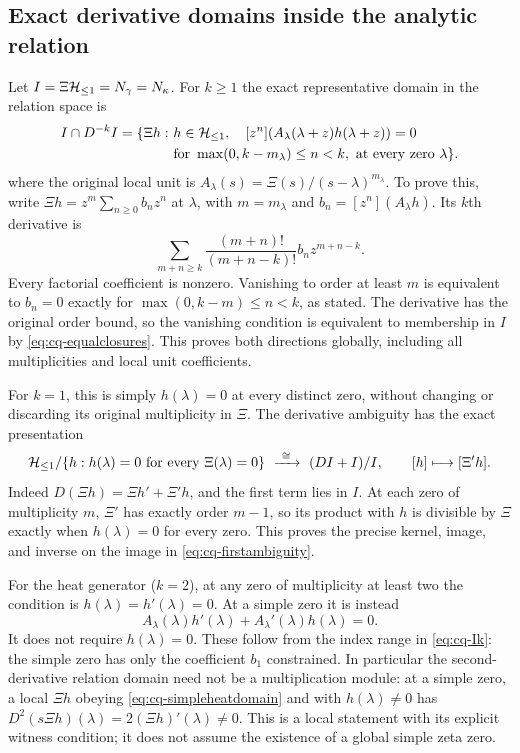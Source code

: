\subsection{Exact derivative domains inside the analytic relation}
Let $I=\Xi\mathcal H_{\leq 1}=N_\gamma=N_\kappa$. For $k\geq1$ the exact
representative domain in the relation space is
\begin{equation}\label{eq:cq-Ik}
 \begin{aligned}
 I\cap D^{-k}I=\{\Xi h:\ &h\in\mathcal H_{\leq 1},\quad
 [z^n](A_\lambda(\lambda+z)h(\lambda+z))=0\\
 &\text{for }\max(0,k-m_\lambda)\leq n<k,
                   \text{ at every zero }\lambda\}.
 \end{aligned}
\end{equation}
where the original local unit is
$A_\lambda(s)=\Xi(s)/(s-\lambda)^{m_\lambda}$.
To prove this, write $\Xi h=z^m\sum_{n\geq0}b_nz^n$ at
$\lambda$, with $m=m_\lambda$ and
$b_n=[z^n](A_\lambda h)$. Its $k$th derivative is
\[
 \sum_{m+n\geq k}\frac{(m+n)!}{(m+n-k)!}
               b_nz^{m+n-k}.
\]
Every factorial coefficient is nonzero. Vanishing to order at least
$m$ is equivalent to $b_n=0$ exactly for
$\max(0,k-m)\leq n<k$, as stated. The derivative has the original
order bound, so the vanishing condition is equivalent to membership
in $I$ by \eqref{eq:cq-equalclosures}. This proves both directions
globally, including all multiplicities and local unit coefficients.

For $k=1$, this is simply $h(\lambda)=0$ at every distinct zero,
without changing or discarding its original multiplicity in $\Xi$.
The derivative ambiguity has the exact presentation
\begin{equation}\label{eq:cq-firstambiguity}
 \mathcal H_{\leq 1}/\{h:h(\lambda)=0\text{ for every }\Xi(\lambda)=0\}
 \ \xrightarrow{\ \cong\ }\ (DI+I)/I,
 \qquad [h]\longmapsto[\Xi'h].
\end{equation}
Indeed $D(\Xi h)=\Xi h'+\Xi'h$, and the first term lies in $I$.
At each zero of multiplicity $m$, $\Xi'$ has exactly order $m-1$,
so its product with $h$ is divisible by $\Xi$ exactly when
$h(\lambda)=0$ for every zero. This proves the precise kernel,
image, and inverse on the image in \eqref{eq:cq-firstambiguity}.

For the heat generator ($k=2$), at any zero of multiplicity at least
two the condition is $h(\lambda)=h'(\lambda)=0$.
At a simple zero it is instead
\begin{equation}\label{eq:cq-simpleheatdomain}
 A_\lambda(\lambda)h'(\lambda)
        +A_\lambda'(\lambda)h(\lambda)=0.
\end{equation}
It does not require $h(\lambda)=0$. These follow from the index
range in \eqref{eq:cq-Ik}: the simple zero has only the coefficient
$b_1$ constrained. In particular the second-derivative relation
domain need not be a multiplication module: at a simple zero, a
local $\Xi h$ obeying \eqref{eq:cq-simpleheatdomain} and with
$h(\lambda)\ne0$ has
$D^2(s\Xi h)(\lambda)=2(\Xi h)'(\lambda)\ne0$.
This is a local statement with its explicit witness condition; it
does not assume the existence of a global simple zeta zero.


